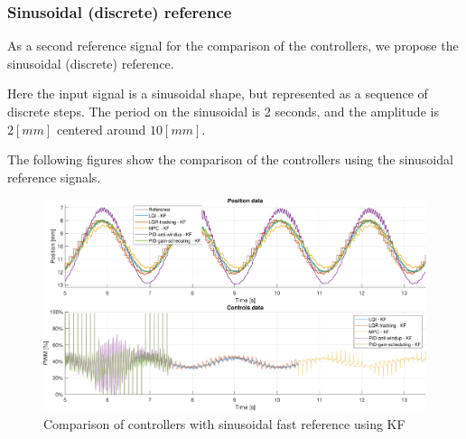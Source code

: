 \subsubsection{Sinusoidal (discrete) reference}
\label{subsubsec:sinusoidal_discrete_reference}

As a second reference signal for the comparison of the controllers, we propose the sinusoidal (discrete) reference.

Here the input signal is a sinusoidal shape, but represented as a sequence of discrete steps.
The period on the sinusoidal is 2 seconds, and the amplitude is $2 [mm]$ centered around $10 [mm]$.

The following figures show the comparison of the controllers using the sinusoidal reference signals.

\begin{figure}[H]
    \centering
    \includegraphics[width=1\linewidth]{./img/MATLAB/results/sinusoidal_fast_star_KF.pdf}
    \caption{Comparison of controllers with sinusoidal fast reference using KF}
\end{figure}

